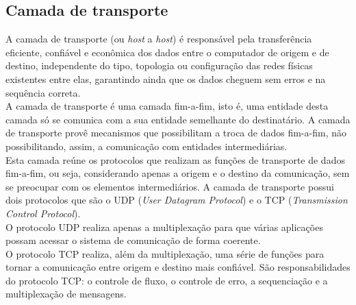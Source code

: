 \subsection{Camada de transporte}
A camada de transporte (ou \textit{host} a \textit{host}) é responsável pela 
transferência eficiente, confiável e econômica dos dados entre o computador de 
origem e de destino, independente do tipo, topologia ou configuração das redes 
físicas existentes entre elas, garantindo ainda que os dados cheguem sem erros 
e na sequência correta.\\
A camada de transporte é uma camada fim-a-fim, isto é, uma entidade desta 
camada só se comunica com a sua entidade semelhante do destinatário. A camada 
de transporte provê mecanismos que possibilitam a troca de dados fim-a-fim, não 
possibilitando, assim, a comunicação com entidades intermediárias.\\
Esta camada reúne os protocolos que realizam as funções de transporte de dados 
fim-a-fim, ou seja, considerando apenas a origem e o destino da comunicação, 
sem se preocupar com os elementos intermediários. A camada de transporte possui 
dois protocolos que são o UDP (\textit{User Datagram Protocol}) e o TCP 
(\textit{Transmission Control Protocol}).\\
O protocolo UDP realiza apenas a multiplexação para que várias aplicações 
possam acessar o sistema de comunicação de forma coerente.\\
O protocolo TCP realiza, além da multiplexação, uma série de funções para 
tornar a comunicação entre origem e destino mais confiável. São 
responsabilidades do protocolo TCP: o controle de fluxo, o controle de erro, a 
sequenciação e a multiplexação de mensagens.\\
